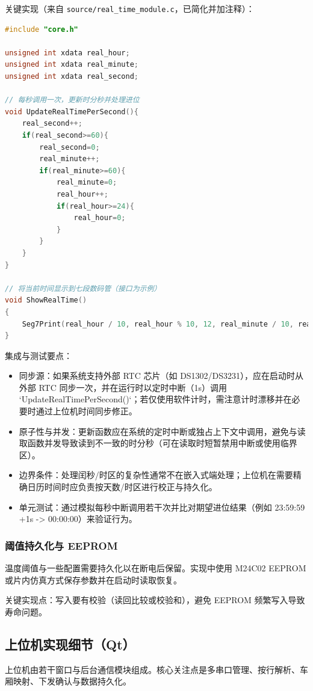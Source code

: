 \documentclass[12pt]{article}
\begin{document}
关键实现（来自 \texttt{source/real\_time\_module.c}，已简化并加注释）：
\begin{lstlisting}[language=C]
#include "core.h"

unsigned int xdata real_hour;
unsigned int xdata real_minute;
unsigned int xdata real_second;

// 每秒调用一次，更新时分秒并处理进位
void UpdateRealTimePerSecond(){
	real_second++;
	if(real_second>=60){
		real_second=0;
		real_minute++;
		if(real_minute>=60){
			real_minute=0;
			real_hour++;
			if(real_hour>=24){
				real_hour=0;
			}
		}
	}
}

// 将当前时间显示到七段数码管（接口为示例）
void ShowRealTime()
{
	Seg7Print(real_hour / 10, real_hour % 10, 12, real_minute / 10, real_minute % 10, 12, real_second / 10, real_second % 10);
}
\end{lstlisting}

集成与测试要点：
\begin{itemize}
\item 同步源：如果系统支持外部 RTC 芯片（如 DS1302/DS3231），应在启动时从外部 RTC 同步一次，并在运行时以定时中断（1s）调用 `UpdateRealTimePerSecond()`；若仅使用软件计时，需注意计时漂移并在必要时通过上位机时间同步修正。
\item 原子性与并发：更新函数应在系统的定时中断或独占上下文中调用，避免与读取函数并发导致读到不一致的时分秒（可在读取时短暂禁用中断或使用临界区）。
\item 边界条件：处理闰秒/时区的复杂性通常不在嵌入式端处理；上位机在需要精确日历时间时应负责按天数/时区进行校正与持久化。
\item 单元测试：通过模拟每秒中断调用若干次并比对期望进位结果（例如 23:59:59 +1s -> 00:00:00）来验证行为。
\end{itemize}


\subsubsection{阈值持久化与 EEPROM}
温度阈值与一些配置需要持久化以在断电后保留。实现中使用 M24C02 EEPROM 或片内仿真方式保存参数并在启动时读取恢复。

关键实现点：写入要有校验（读回比较或校验和），避免 EEPROM 频繁写入导致寿命问题。

\subsection{上位机实现细节（Qt）}
上位机由若干窗口与后台通信模块组成。核心关注点是多串口管理、按行解析、车厢映射、下发确认与数据持久化。
\end{document}
